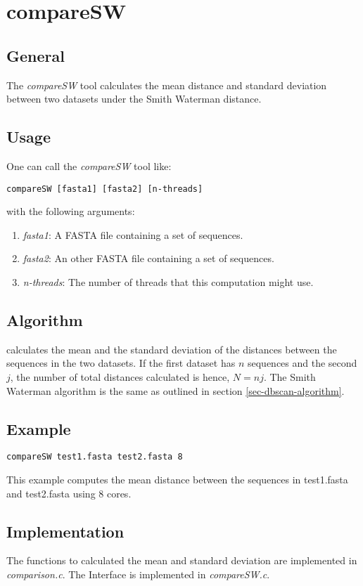 \section{compareSW}

\subsection{General}

The \emph{compareSW} tool calculates the mean distance and standard deviation
between two datasets under the Smith Waterman distance.

\subsection{Usage}

One can call the \emph{compareSW} tool like:
\begin{lstlisting}
compareSW [fasta1] [fasta2] [n-threads]
\end{lstlisting}
with the following arguments:
\begin{enumerate}
\item \emph{fasta1}: A FASTA file containing a set of sequences.
\item \emph{fasta2}: An other FASTA file containing a set of sequences.
\item \emph{n-threads}: The number of threads that this computation might use.
\end{enumerate}

\subsection{Algorithm}

calculates the mean and the standard deviation of the distances
between the sequences in the two datasets. If the first dataset has
$n$ sequences and the second $j$, the number of total distances
calculated is hence, $N=nj$. The Smith Waterman algorithm is the same
as outlined in section \ref{sec-dbscan-algorithm}. 

\subsection{Example}
\begin{lstlisting}
compareSW test1.fasta test2.fasta 8
\end{lstlisting}
This example computes the mean distance between the sequences in test1.fasta
and test2.fasta using 8 cores. 

\subsection{Implementation}
The functions to calculated the mean and standard deviation are
implemented in \emph{comparison.c}. The Interface is implemented in
\emph{compareSW.c}.
